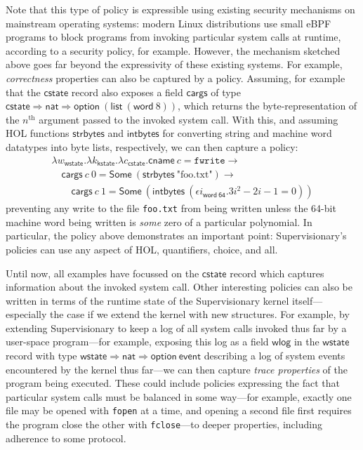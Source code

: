 \documentclass[a4paper, UKenglish, cleveref, autoref, thm-restate, colorlinks]{lipics-v2021}
\newcommand{\eps}[1]{\epsilon{#1}.}
\newcommand{\lam}[1]{\lambda{#1}.}
\begin{document}
Note that this type of policy is expressible using existing security mechanisms on mainstream operating systems: modern Linux distributions use small eBPF programs to block programs from invoking particular system calls at runtime, according to a security policy, for example.
However, the mechanism sketched above goes far beyond the expressivity of these existing systems.
For example, \emph{correctness} properties can also be captured by a policy.
Assuming, for example that the $\mathsf{cstate}$ record also exposes a field $\mathsf{cargs}$ of type $\mathsf{cstate} \Rightarrow \mathsf{nat} \Rightarrow \mathsf{option}\ (\mathsf{list}\ (\mathsf{word}\ 8))$, which returns the byte-representation of the $n^\mathrm{th}$ argument passed to the invoked system call.
With this, and assuming HOL functions $\mathsf{strbytes}$ and $\mathsf{intbytes}$ for converting string and machine word datatypes into byte lists, respectively, we can then capture a policy:
\begin{gather*}
\lam{w_{\mathsf{wstate}}}\lam{k_{\mathsf{kstate}}}\lam{c_{\mathsf{cstate}}}\mathsf{cname}\ c = \mathtt{fwrite} \longrightarrow \\
\quad\mathsf{cargs}\ c\ 0 = \mathsf{Some}\ (\mathsf{strbytes}\ \text{"foo.txt"}) \longrightarrow \\
\qquad\mathsf{cargs}\ c\ 1 = \mathsf{Some}\ (\mathsf{intbytes}\ (\eps{i_\mathsf{word\ 64}}3i^2 - 2i - 1 = 0))
\end{gather*}
preventing any write to the file \texttt{foo.txt} from being written unless the 64-bit machine word being written is \emph{some} zero of a particular polynomial.
In particular, the policy above demonstrates an important point: Supervisionary's policies can use any aspect of HOL, quantifiers, choice, and all.

Until now, all examples have focussed on the $\mathsf{cstate}$ record which captures information about the invoked system call.
Other interesting policies can also be written in terms of the runtime state of the Supervisionary kernel itself---especially the case if we extend the kernel with new structures.
For example, by extending Supervisionary to keep a log of all system calls invoked thus far by a user-space program---for example, exposing this log as a field $\mathsf{wlog}$ in the $\mathsf{wstate}$ record with type $\mathsf{wstate} \Rightarrow \mathsf{nat} \Rightarrow \mathsf{option}\ \mathsf{event}$ describing a log of system events encountered by the kernel thus far---we can then capture \emph{trace properties} of the program being executed.
These could include policies expressing the fact that particular system calls must be balanced in some way---for example, exactly one file may be opened with \texttt{fopen} at a time, and opening a second file first requires the program close the other with \texttt{fclose}---to deeper properties, including adherence to some protocol.
\end{document}

